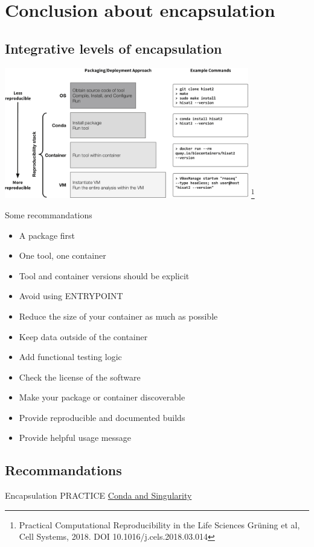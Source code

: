 \section{Conclusion about encapsulation}
\subsection{Integrative levels of encapsulation}
\begin{frame}
\centering\includegraphics[width=0.8\textwidth]{images/reproductibility.jpg} \footnote{Practical Computational Reproducibility in the Life Sciences
Grüning et al, Cell Systems, 2018. DOI 10.1016/j.cels.2018.03.014}
\end{frame}


\begin{frame}[<+->]
Some recommandations 
\begin{itemize}
\item A package first
\item One tool, one container
\item Tool and container versions should be explicit
\item Avoid using ENTRYPOINT
\item Reduce the size of your container as much as possible
\item Keep data outside of the container
\item Add functional testing logic
\item Check the license of the software
\item Make your package or container discoverable
\item Provide reproducible and documented builds
\item Provide helpful usage message
\end{itemize}
\end{frame}

\subsection{Recommandations}
\begin{frame}
\begin{block}{Encapsulation PRACTICE}
\href{https://github.com/mesocentre-clermont-auvergne/formation_fair_2022/tree/main/fair_encapsulation/encapsulation_TP}{Conda and Singularity}

\end{block}
\end{frame}